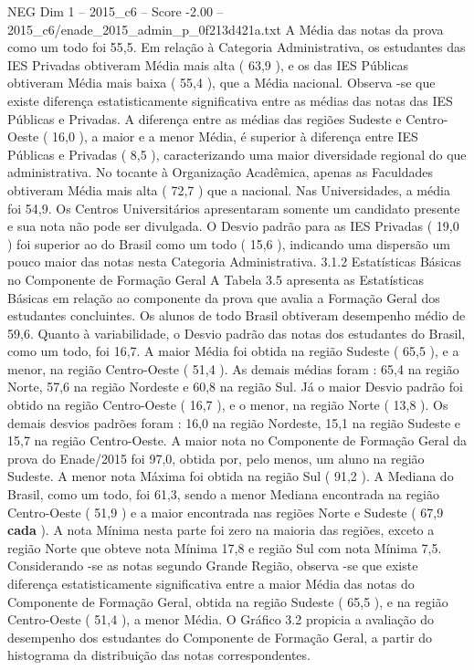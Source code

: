 \begin{textsample}{NEG Dim 1 – 2015\_c6 – Score -2.00 – 2015\_c6/enade\_2015\_admin\_p\_0f213d421a.txt}
A Média das notas da prova como um todo foi 55,5.
Em relação à Categoria Administrativa, os estudantes das IES Privadas obtiveram Média mais alta ( 63,9 ), e os das IES Públicas obtiveram Média mais baixa ( 55,4 ), que a Média nacional.
Observa -se que existe diferença estatisticamente significativa entre as médias das notas das IES Públicas e Privadas.
A diferença entre as médias das regiões Sudeste e Centro-Oeste ( 16,0 ), a maior e a menor Média, é superior à diferença entre IES Públicas e Privadas ( 8,5 ), caracterizando uma maior diversidade regional do que administrativa.
No tocante à Organização Acadêmica, apenas as Faculdades obtiveram Média mais alta ( 72,7 ) que a nacional.
Nas Universidades, a média foi 54,9.
Os Centros Universitários apresentaram somente um candidato presente e sua nota não pode ser divulgada.
O Desvio padrão para as IES Privadas ( 19,0 ) foi superior ao do Brasil como um todo ( 15,6 ), indicando uma dispersão um pouco maior das notas nesta Categoria Administrativa. 3.1.2 Estatísticas Básicas no Componente de Formação Geral A Tabela 3.5 apresenta as Estatísticas Básicas em relação ao componente da prova que avalia a Formação Geral dos estudantes concluintes.
Os alunos de todo Brasil obtiveram desempenho médio de 59,6.
Quanto à variabilidade, o Desvio padrão das notas dos estudantes do Brasil, como um todo, foi 16,7.
A maior Média foi obtida na região Sudeste ( 65,5 ), e a menor, na região Centro-Oeste ( 51,4 ).
As demais médias foram : 65,4 na região Norte, 57,6 na região Nordeste e 60,8 na região Sul.
Já o maior Desvio padrão foi obtido na região Centro-Oeste ( 16,7 ), e o menor, na região Norte ( 13,8 ).
Os demais desvios padrões foram : 16,0 na região Nordeste, 15,1 na região Sudeste e 15,7 na região Centro-Oeste.
A maior nota no Componente de Formação Geral da prova do Enade/2015 foi 97,0, obtida por, pelo menos, um aluno na região Sudeste.
A menor nota Máxima foi obtida na região Sul ( 91,2 ).
A Mediana do Brasil, como um todo, foi 61,3, sendo a menor Mediana encontrada na região Centro-Oeste ( 51,9 ) e a maior encontrada nas regiões Norte e Sudeste ( 67,9 \textbf{cada} ).
A nota Mínima nesta parte foi zero na maioria das regiões, exceto a região Norte que obteve nota Mínima 17,8 e região Sul com nota Mínima 7,5.
Considerando -se as notas segundo Grande Região, observa -se que existe diferença estatisticamente significativa entre a maior Média das notas do Componente de Formação Geral, obtida na região Sudeste ( 65,5 ), e na região Centro-Oeste ( 51,4 ), a menor Média.
O Gráfico 3.2 propicia a avaliação do desempenho dos estudantes do Componente de Formação Geral, a partir do histograma da distribuição das notas correspondentes.

\end{textsample}
